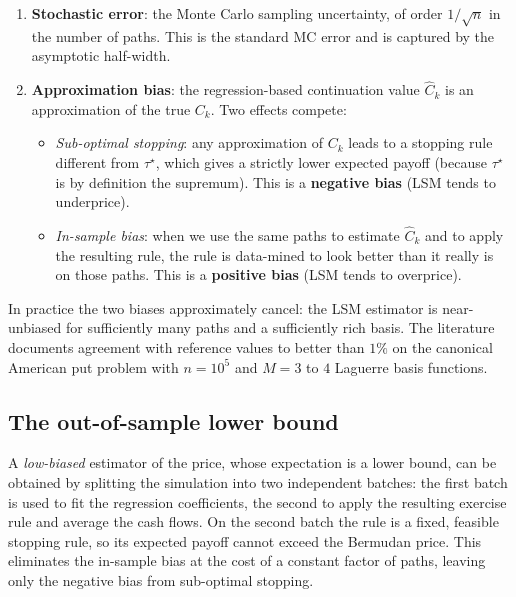 \documentclass[11pt,a4paper]{article}
\theoremstyle{plain}
\theoremstyle{definition}
\theoremstyle{remark}
\begin{document}
\begin{enumerate}
\item \textbf{Stochastic error}: the Monte Carlo sampling
      uncertainty, of order $1/\sqrt n$ in the number of paths. This
      is the standard MC error and is captured by the asymptotic
      half-width.

\item \textbf{Approximation bias}: the regression-based continuation
      value $\widehat C_k$ is an approximation of the true $C_k$.
      Two effects compete:

      \begin{itemize}
      \item \emph{Sub-optimal stopping}: any approximation of
            $C_k$ leads to a stopping rule different from $\tau^\star$,
            which gives a strictly lower expected payoff (because
            $\tau^\star$ is by definition the supremum). This is a
            \textbf{negative bias} (LSM tends to underprice).
      \item \emph{In-sample bias}: when we use the same paths to
            estimate $\widehat C_k$ and to apply the resulting rule,
            the rule is data-mined to look better than it really is
            on those paths. This is a \textbf{positive bias} (LSM
            tends to overprice).
      \end{itemize}
\end{enumerate}

In practice the two biases approximately cancel: the LSM estimator is
near-unbiased for sufficiently many paths and a sufficiently rich
basis. The literature documents agreement with reference values to
better than $1\%$ on the canonical American put problem with $n =
10^5$ and $M = 3$ to $4$ Laguerre basis functions.

\subsection{The out-of-sample lower bound}

A \emph{low-biased} estimator of the price, whose expectation is a
lower bound, can be obtained by splitting the simulation into two
independent batches: the first batch is used to fit the regression
coefficients, the second to apply the resulting exercise rule and
average the cash flows. On the second batch the rule is a fixed,
feasible stopping rule, so its expected payoff cannot exceed the
Bermudan price. This eliminates the in-sample bias at the cost of a
constant factor of paths, leaving only the negative bias from
sub-optimal stopping.
\end{document}
